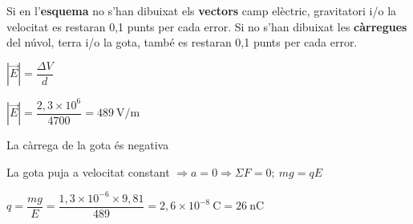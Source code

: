 \begin{solapartat}

Si en l'\textbf{esquema} no s'han dibuixat els \textbf{vectors} camp elèctric, gravitatori i/o la velocitat es restaran 0,1 punts per cada error. Si no s'han dibuixat les \textbf{càrregues} del núvol, terra i/o la gota, també es restaran 0,1 punts per cada error.

 $\left|\vec{E}\right| = \dfrac{\Delta V}{d}$

 $\left|\vec{E}\right| = \dfrac{2,3\times 10^{6}}{4700} = 489\ \mathrm{V/m}$
\end{solapartat}

\begin{solapartat}
 La càrrega de la gota és negativa

 La gota puja a velocitat constant $\Rightarrow a = 0 \Rightarrow \Sigma F = 0;\ mg = qE$

 $q = \dfrac{mg}{E} = \dfrac{1,3\times 10^{-6}\times 9,81}{489} = 2,6\times 10^{-8}\ \mathrm{C} = 26\ \mathrm{nC}$
\end{solapartat}
